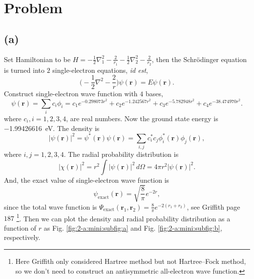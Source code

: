 \documentclass[12pt]{article}
\newcommand*{\RMN}[1]{\uppercase\expandafter{\romannumeral#1}}
\begin{document}
\section{Problem \RMN{2}}

\subsection*{(a)}

Set Hamiltonian to be $H = - \frac{1}{2}\nabla_1^2 - \frac{2}{r_1} - \frac{1}{2}\nabla_2^2 - \frac{2}{r_2}$, then
the Schr\"{o}dinger equation is turned into $2$ single-electron equations, \textit{id est},
\begin{equation}
    \Big(- \frac{1}{2}\nabla^2 - \frac{2}{r} \Big) \psi(\symbf{r}) = E \psi(\symbf{r}).
\end{equation}
Construct single-electron wave function with $4$ bases,
\begin{equation}
    \psi(\symbf{r}) = \sum_{i} c_i \phi_i = c_1 e^{- 0.298073 r^2} +
    c_2 e^{- 1.242567 r^2} + c_3 e^{- 5.782948 r^2} + c_4 e^{-38.474970 r^2}.
\end{equation}
where $c_i, i=1,2,3,4$, are real numbers.
Now the ground state energy is \SI{-1.99426616}{\electronvolt}.
The density is
\begin{equation}\label{eq:density}
    \lvert \psi(\symbf{r}) \rvert^2= \psi^\ast(\symbf{r}) \psi(\symbf{r}) =
    \sum_{i, j} c_i^\ast c_j \phi_i^\ast(\symbf{r}) \phi_j(\symbf{r}),
\end{equation}
where $i, j=1,2,3,4$.
The radial probability distribution is
\begin{equation}
    \lvert \chi(\symbf{r}) \rvert^2= r^2\int \lvert \psi(\symbf{r}) \rvert^2
    \, d\Omega = 4\pi r^2 \lvert \psi(\symbf{r}) \rvert^2.
\end{equation}
And, the exact value of single-electron wave function is
\begin{equation}
    \psi_{\text{exact}}(\symbf{r}) = \sqrt{\frac{8}{\pi}} e^{-2 r},  %
\end{equation}
since the total wave function is
$\Psi_{\text{exact}}(\symbf{r}_1, \symbf{r}_2) = \frac{8}{\pi}
    e^{-2(r_1 + r_2)}$, see Griffith page $187$ \footnote{Here
    Griffith only considered Hartree method but not
    Hartree--Fock method, so we don't need to construct an
    antisymmetric all-electron wave function.}.
Then we can plot the density and radial probability distribution as a function of $r$
as Fig.  \ref{fig:2-a:mini:subfig:a} and Fig. \ref{fig:2-a:mini:subfig:b}, respectively.
\end{document}
